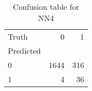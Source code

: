 \begin{table}[h!]
\caption{Confusion table for NN4}
\label{tab:NN4}
\begin{tabular}{lrr}
\toprule
Truth & 0 & 1 \\
Predicted &  &  \\
\midrule
0 & 1644 & 316 \\
1 & 4 & 36 \\
\bottomrule
\end{tabular}
\end{table}
